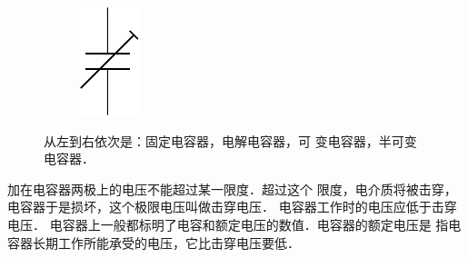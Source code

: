 \begin{figure}[htbp]
    \hfil
    \begin{subfigure}{0.2\linewidth}
        \centering
        \includegraphics{fig/B/6-38d.pdf}
        \caption{}\label{fig_B_6-38d}
    \end{subfigure}
    \caption{从左到右依次是：固定电容器，电解电容器，可
    变电容器，半可变电容器．}\label{fig_B_6-38}
\end{figure}

加在电容器两极上的电压不能超过某一限度．超过这个
限度，电介质将被击穿，电容器于是损坏，这个极限电压叫做击穿电压．
电容器工作时的电压应低于击穿电压．
电容器上一般都标明了电容和额定电压的数值．电容器的额定电压是
指电容器长期工作所能承受的电压，它比击穿电压要低．

